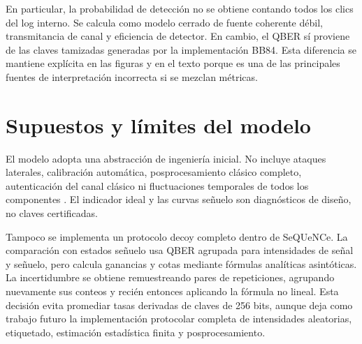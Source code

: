 En particular, la probabilidad de detección no se obtiene contando todos los clics del log interno. Se calcula como modelo cerrado de fuente coherente débil, transmitancia de canal y eficiencia de detector. En cambio, el QBER sí proviene de las claves tamizadas generadas por la implementación BB84. Esta diferencia se mantiene explícita en las figuras y en el texto porque es una de las principales fuentes de interpretación incorrecta si se mezclan métricas.

\section{Supuestos y límites del modelo}

El modelo adopta una abstracción de ingeniería inicial. No incluye ataques laterales, calibración automática, posprocesamiento clásico completo, autenticación del canal clásico ni fluctuaciones temporales de todos los componentes \cite{scarani2009security}. El indicador ideal y las curvas señuelo son diagnósticos de diseño, no claves certificadas.

Tampoco se implementa un protocolo decoy completo dentro de SeQUeNCe. La comparación con estados señuelo usa QBER agrupada para intensidades de señal y señuelo, pero calcula ganancias y cotas mediante fórmulas analíticas asintóticas. La incertidumbre se obtiene remuestreando pares de repeticiones, agrupando nuevamente sus conteos y recién entonces aplicando la fórmula no lineal. Esta decisión evita promediar tasas derivadas de claves de 256 bits, aunque deja como trabajo futuro la implementación protocolar completa de intensidades aleatorias, etiquetado, estimación estadística finita y posprocesamiento.
